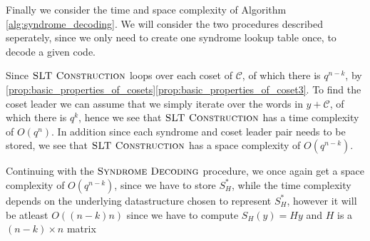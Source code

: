 Finally we consider the time and space complexity of Algorithm \ref{alg:syndrome_decoding}. We will consider the two procedures described seperately, since we only need to create one syndrome lookup table once, to decode
a given code.

Since $\textsc{SLT Construction}$ loops over each coset of $\mathcal{C}$, of which there is $q^{n - k}$, by \ref{prop:basic_properties_of_cosets}\ref{prop:basic_properties_of_coset3}. To find the coset leader we can assume that we simply iterate over the words in $y + \mathcal{C}$, of which there is $q^k$, hence we see that $\textsc{SLT Construction}$ has a time complexity of $O(q^{n})$. In addition since each syndrome and coset leader pair needs to be stored, we see that $\textsc{SLT Construction}$ has a space complexity of $O(q^{n - k})$.

Continuing with the $\textsc{Syndrome Decoding}$ procedure, we once again get a space complexity of $O(q^{n - k})$, since we have to store $S_H^{*}$, while the time complexity depends on the underlying datastructure chosen to represent $S_H^{*}$, however it will be atleast $O((n - k)n)$ since we have to compute $S_H(y) = Hy$ and $H$ is a $(n - k) \times n$ matrix
